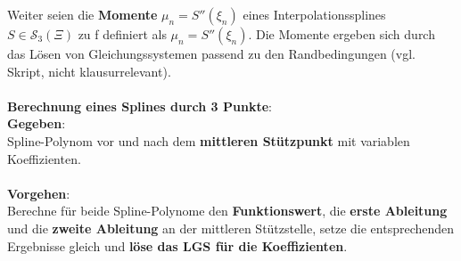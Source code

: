 Weiter seien die \textbf{Momente} $\mu_n = S''(\xi_n)$ eines Interpolationssplines $S \in \mathscr{S}_3(\Xi)$ zu f definiert als $\mu_n = S''(\xi_n)$. Die Momente ergeben sich durch das Lösen von Gleichungssystemen passend zu den Randbedingungen (vgl. Skript, nicht klausurrelevant).\\\\
\textbf{Berechnung eines Splines durch 3 Punkte}:\\
\textbf{Gegeben}:\\Spline-Polynom vor und nach dem \textbf{mittleren Stützpunkt} mit variablen Koeffizienten.\\\\
\textbf{Vorgehen}:\\Berechne für beide Spline-Polynome den \textbf{Funktionswert}, die \textbf{erste Ableitung} und die \textbf{zweite Ableitung} an der mittleren Stützstelle, setze die entsprechenden Ergebnisse gleich und \textbf{löse das LGS für die Koeffizienten}.